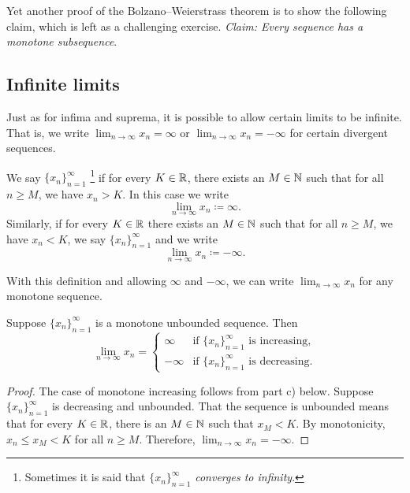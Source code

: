 Yet another proof of the Bolzano--Weierstrass theorem is to show the
following claim,
which is left as a challenging exercise.
\emph{Claim: Every sequence has a monotone subsequence}.

\subsection{Infinite limits}

Just as for infima and suprema, it is possible to allow certain
limits to be infinite.  That is, we write $\lim_{n\to\infty} x_n = \infty$ or
$\lim_{n\to\infty} x_n = -\infty$ for certain divergent sequences.

\begin{defn}
We say
$\{ x_n \}_{n=1}^\infty$ \emph{}%
\footnote{Sometimes it is said that $\{ x_n \}_{n=1}^\infty$ \emph{converges to infinity}.}
if for every $K \in
{\mathbb{R}}$, there exists an $M \in {\mathbb{N}}$ such that for all $n \geq M$, we have $x_n >
K$.  In this case we write
\begin{equation*}
\lim_{n \to \infty} x_n \coloneqq \infty .  
\end{equation*}
Similarly,
if for every $K \in {\mathbb{R}}$ there exists an $M \in {\mathbb{N}}$ such that
for all $n \geq M$, we have $x_n < K$, we say $\{ x_n \}_{n=1}^\infty$
\emph{} and we write
\begin{equation*}
\lim_{n \to \infty} x_n \coloneqq -\infty .  
\end{equation*}
\end{defn}

With this definition and allowing $\infty$ and $-\infty$,
we can write $\lim_{n\to\infty} x_n$ for any monotone sequence.

\begin{prop} \label{prop:unboundedmonotone}
Suppose $\{ x_n \}_{n=1}^\infty$ is a monotone unbounded sequence.  Then
\begin{equation*}
\lim_{n \to \infty} x_n =
\begin{cases}
\infty  & \text{if } \{ x_n \}_{n=1}^\infty \text{ is increasing,} \\
-\infty & \text{if } \{ x_n \}_{n=1}^\infty \text{ is decreasing.}
\end{cases}
\end{equation*}
\end{prop}

\begin{proof}
The case of monotone increasing follows from
 part c) below.
Suppose $\{x_n\}_{n=1}^\infty$ is decreasing and unbounded.
That the sequence is unbounded means that
for every $K \in {\mathbb{R}}$, there is an $M \in {\mathbb{N}}$ such that $x_M < K$.
By monotonicity, $x_n \leq x_M < K$ for all $n \geq M$.
Therefore, $\lim_{n\to\infty} x_n = -\infty$.
\end{proof}

